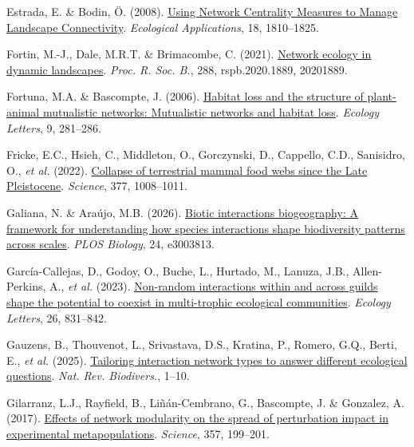 \documentclass[
]{article}
\newlength{\cslhangindent}
\newenvironment{CSLReferences}[2] %
 {\begin{list}{}{%
  \setlength{\itemindent}{0pt}
  \setlength{\leftmargin}{0pt}
  \setlength{\parsep}{0pt}
  \ifodd #1
   \setlength{\leftmargin}{\cslhangindent}
   \setlength{\itemindent}{-1\cslhangindent}
  \fi
  \setlength{\itemsep}{#2\baselineskip}}}
 {\end{list}}
\begin{document}
\begin{CSLReferences}{1}{0}
Estrada, E. \& Bodin, Ö. (2008).
\href{https://doi.org/10.1890/07-1419.1}{Using {Network Centrality
Measures} to {Manage Landscape Connectivity}}. \emph{Ecological
Applications}, 18, 1810--1825.

Fortin, M.-J., Dale, M.R.T. \& Brimacombe, C. (2021).
\href{https://doi.org/10.1098/rspb.2020.1889}{Network ecology in dynamic
landscapes}. \emph{Proc. R. Soc. B.}, 288, rspb.2020.1889, 20201889.

Fortuna, M.A. \& Bascompte, J. (2006).
\href{https://doi.org/10.1111/j.1461-0248.2005.00868.x}{Habitat loss and
the structure of plant-animal mutualistic networks: {Mutualistic}
networks and habitat loss}. \emph{Ecology Letters}, 9, 281--286.

Fricke, E.C., Hsieh, C., Middleton, O., Gorczynski, D., Cappello, C.D.,
Sanisidro, O., \emph{et al.} (2022).
\href{https://doi.org/10.1126/science.abn4012}{Collapse of terrestrial
mammal food webs since the {Late Pleistocene}}. \emph{Science}, 377,
1008--1011.

Galiana, N. \& Araújo, M.B. (2026).
\href{https://doi.org/10.1371/journal.pbio.3003813}{Biotic interactions
biogeography: {A} framework for understanding how species interactions
shape biodiversity patterns across scales}. \emph{PLOS Biology}, 24,
e3003813.

García-Callejas, D., Godoy, O., Buche, L., Hurtado, M., Lanuza, J.B.,
Allen-Perkins, A., \emph{et al.} (2023).
\href{https://doi.org/10.1111/ele.14206}{Non-random interactions within
and across guilds shape the potential to coexist in multi-trophic
ecological communities}. \emph{Ecology Letters}, 26, 831--842.

Gauzens, B., Thouvenot, L., Srivastava, D.S., Kratina, P., Romero, G.Q.,
Berti, E., \emph{et al.} (2025).
\href{https://doi.org/10.1038/s44358-025-00056-7}{Tailoring interaction
network types to answer different ecological questions}. \emph{Nat. Rev.
Biodivers.}, 1--10.

Gilarranz, L.J., Rayfield, B., Liñán-Cembrano, G., Bascompte, J. \&
Gonzalez, A. (2017).
\href{https://doi.org/10.1126/science.aal4122}{Effects of network
modularity on the spread of perturbation impact in experimental
metapopulations}. \emph{Science}, 357, 199--201.


\end{CSLReferences}
\end{document}

